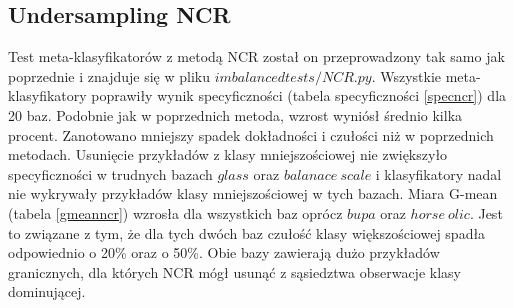 \subsection{Undersampling NCR}
Test meta-klasyfikatorów z metodą NCR został on przeprowadzony tak samo jak poprzednie i znajduje się w pliku $imbalancedtests/NCR.py$. Wszystkie meta-klasyfikatory poprawiły wynik specyficzności (tabela specyficzności \ref{specncr}) dla 20 baz. Podobnie jak w poprzednich metoda, wzrost wyniósł średnio kilka procent. Zanotowano mniejszy spadek dokładności i czułości niż w poprzednich metodach. Usunięcie przykładów z klasy mniejszościowej nie zwiększyło specyficzności w trudnych bazach $glass$ oraz $balanace\: scale$ i klasyfikatory nadal nie wykrywały przykładów klasy mniejszościowej w tych bazach. Miara G-mean (tabela \ref{gmeanncr}) wzrosła dla wszystkich baz oprócz $bupa$ oraz $horse\: olic$. Jest to związane z tym, że dla tych dwóch baz czułość klasy większościowej spadła odpowiednio o 20\% oraz o 50\%. Obie bazy zawierają dużo przykładów granicznych, dla których NCR mógł usunąć z sąsiedztwa obserwacje klasy dominującej.
